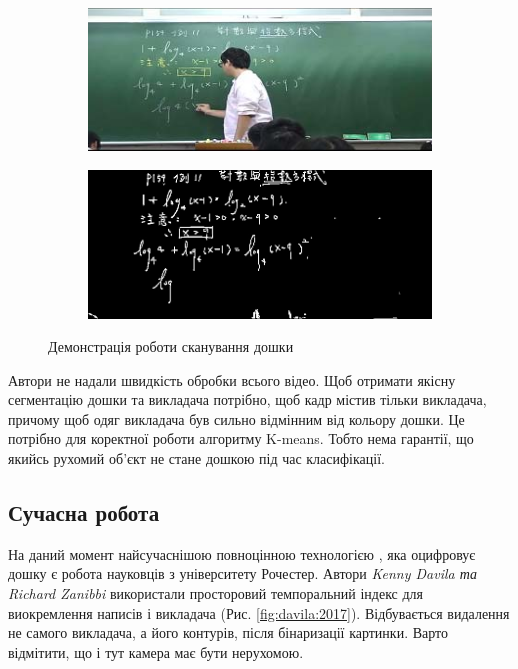 \begin{figure}[H]
  \centering
  \begin{subfigure}[b]{0.35\textwidth}
    \centering
    \includegraphics[width=\textwidth]{images/yeh_1}
  \end{subfigure}
  \begin{subfigure}[b]{0.35\textwidth}
    \centering
    \includegraphics[width=\textwidth]{images/yeh_2}
  \end{subfigure}
  \caption{Демонстрація роботи сканування дошки \cite{yeh}
    \label{fig:yeh}
  }
\end{figure}

Автори не надали швидкість обробки всього відео. Щоб отримати якісну сегментацію
дошки та викладача потрібно, щоб кадр містив тільки викладача, причому щоб одяг викладача
був сильно відмінним від кольору дошки. Це потрібно для коректної роботи алгоритму K-means.
Тобто нема гарантії, що якийсь рухомий об'єкт не стане  дошкою під час класифікації.

\subsection{Сучасна робота}

На даний момент найсучаснішою повноцінною технологією \cite{davila:2017}, яка оцифровує дошку є робота
науковців з університету Рочестер. Автори \textit{Kenny Davila та Richard Zanibbi}
використали просторовий темпоральний індекс для виокремлення написів і викладача (Рис. \ref{fig:davila:2017}).
Відбувається видалення не самого викладача,  а його контурів, після бінаризації картинки.
Варто відмітити, що і тут камера має бути нерухомою.

